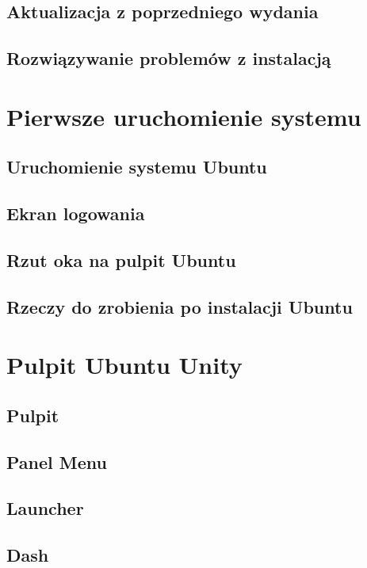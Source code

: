 \documentclass[a4paper,11pt,oneside]{mwart}
\begin{document}
		\subsection{Aktualizacja z poprzedniego wydania}
		\subsection{Rozwiązywanie problemów z instalacją}
			 
	\section{Pierwsze uruchomienie systemu}
		\subsection{Uruchomienie systemu Ubuntu}
			
		\subsection{Ekran logowania}
			
		\subsection{Rzut oka na pulpit Ubuntu}
			
		\subsection{Rzeczy do zrobienia po instalacji Ubuntu}
			
	\section{Pulpit Ubuntu Unity}
	\label{pulpit_unity}
		\subsection{Pulpit}
			 
		\subsection{Panel Menu}
			
		\subsection{Launcher}
			
		\subsection{Dash}
			
\end{document}

